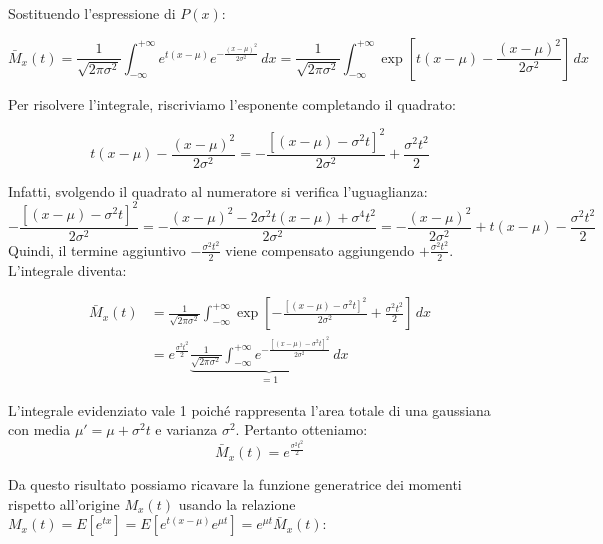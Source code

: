 \documentclass[openany,a4paper,12pt]{book}
\theoremstyle{remark}
\begin{document}
Sostituendo l'espressione di $P(x)$:

\begin{equation}
\bar{M}_x(t) = \frac{1}{\sqrt{2\pi \sigma^2}} \int_{-\infty}^{+\infty} e^{t(x-\mu)} e^{-\frac{(x-\mu)^2}{2\sigma^2}} \, dx = \frac{1}{\sqrt{2\pi \sigma^2}} \int_{-\infty}^{+\infty} \exp \left[ t(x-\mu) - \frac{(x-\mu)^2}{2\sigma^2} \right] \, dx
\end{equation}

Per risolvere l'integrale, riscriviamo l'esponente completando il quadrato:

\begin{equation}
t(x-\mu) - \frac{(x-\mu)^2}{2\sigma^2} = - \frac{\left[ (x-\mu) - \sigma^2 t \right]^2}{2\sigma^2} + \frac{\sigma^2 t^2}{2}
\end{equation}

Infatti, svolgendo il quadrato al numeratore si verifica l'uguaglianza:
\begin{equation}
-\frac{\left[ (x-\mu) - \sigma^2 t \right]^2}{2\sigma^2} = -\frac{(x-\mu)^2 - 2 \sigma^2 t (x-\mu) + \sigma^4 t^2}{2\sigma^2} = -\frac{(x-\mu)^2}{2\sigma^2} + t(x-\mu) - \frac{\sigma^2 t^2}{2}
\end{equation}
Quindi, il termine aggiuntivo $-\frac{\sigma^2 t^2}{2}$ viene compensato aggiungendo $+\frac{\sigma^2 t^2}{2}$. L'integrale diventa:

\begin{equation}
\begin{aligned}
\bar{M}_x(t) &= \frac{1}{\sqrt{2\pi \sigma^2}} \int_{-\infty}^{+\infty}  \exp\left[ -\frac{\left[ (x-\mu) - \sigma^2 t \right]^2}{2\sigma^2} + \frac{\sigma^2 t^2}{2} \right] \, dx \\
&= e^{\frac{\sigma^2 t^2}{2}} \underbrace{\frac{1}{\sqrt{2\pi \sigma^2}} \int_{-\infty}^{+\infty} e^{-\frac{\left[ (x-\mu) - \sigma^2 t \right]^2}{2\sigma^2}} \, dx}_{=1}
\end{aligned}
\end{equation}

L'integrale evidenziato vale 1 poiché rappresenta l'area totale di una gaussiana con media $\mu' = \mu + \sigma^2 t$ e varianza $\sigma^2$. Pertanto otteniamo:
\begin{equation} \boxed{
\bar{M}_x(t) = e^{\frac{\sigma^2 t^2}{2}}}
\end{equation}

Da questo risultato possiamo ricavare la funzione generatrice dei momenti rispetto all'origine $M_x(t)$ usando la relazione $M_x(t) = E[e^{tx}] = E[e^{t(x-\mu)} e^{\mu t}] = e^{\mu t} \bar{M}_x(t)$:
\end{document}
